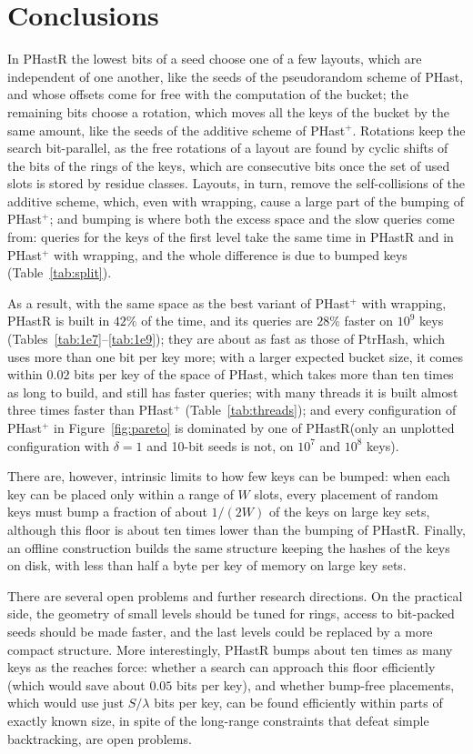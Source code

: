 \documentclass[11pt]{article}
\newcommand{\PHast}{PHast\xspace}
\newcommand{\PHastP}{PHast$^+$\xspace}
\newcommand{\PHastR}{PHastR\xspace}
\begin{document}
\section{Conclusions}

In \PHastR the lowest bits of a seed choose one of a few layouts, which are
independent of one another,
like the seeds of the pseudorandom scheme of \PHast, and whose offsets come
for free with the computation of the bucket; the remaining bits choose a
rotation, which moves all the keys of the bucket by the same amount, like
the seeds of the additive scheme of \PHastP. Rotations
keep the search bit-parallel, as the free rotations of a layout are found by
cyclic shifts of the bits of the rings of the keys, which are consecutive bits
once the set of used slots is stored by residue classes. Layouts, in turn,
remove the self-collisions of the additive scheme, which, even with wrapping,
cause a large part of the bumping of \PHastP; and
bumping is where both the excess space and the slow queries come from:
queries for the keys of the first level take the same time in \PHastR and in
\PHastP with wrapping, and the whole difference is due to bumped keys
(Table~\ref{tab:split}).

As a result, with the same space as the best
variant of \PHastP with wrapping, \PHastR is built in $42\%$ of the time, and
its queries are $28\%$ faster on $10^9$ keys
(Tables~\ref{tab:1e7}--\ref{tab:1e9}); they are about as fast as those of
PtrHash, which uses more than one bit per key more; with a larger expected
bucket size,
it comes within $0.02$ bits per key of the space of \PHast, which takes more
than ten times as long to build, and still has faster queries; with many
threads it is built almost three times faster than \PHastP
(Table~\ref{tab:threads}); and every configuration of \PHastP in
Figure~\ref{fig:pareto} is dominated by one of \PHastR (only an unplotted
configuration with $\delta=1$ and 10-bit seeds is not, on $10^7$ and $10^8$
keys). 

There are, however, intrinsic limits to how few keys can be
bumped: when each key can be placed only within a range of $W$ slots, every
placement of random keys must bump a fraction of about $1/(2W)$ of the keys
on large key sets, although this floor is about ten times lower than the
bumping of \PHastR. Finally, an offline
construction builds the same structure keeping the hashes of the keys on disk,
with less than half a byte per key of memory on large key sets.

There are several open problems and further research directions. On the
practical side, the geometry of small levels should be tuned for rings,
access to bit-packed seeds should be made faster, and the
last levels could be replaced by a more compact structure. More interestingly,
\PHastR bumps about ten times as many keys as the reaches force: whether a
search can approach this floor efficiently (which would save about $0.05$
bits per key), and whether bump-free placements, which would use just
$S/\lambda$ bits per key, can be found efficiently within parts of exactly
known size, in spite of the long-range constraints that defeat simple
backtracking, are open problems.


\end{document}
